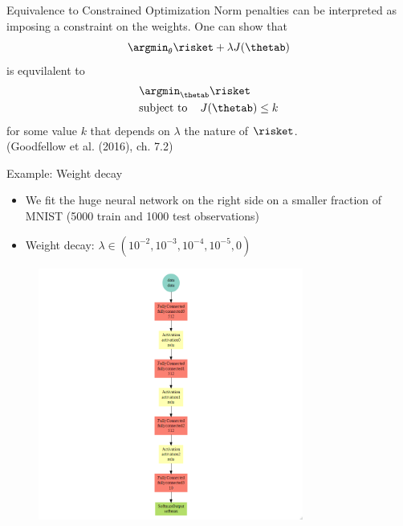 \begin{frame}{Equivalence to Constrained Optimization}
Norm penalties can be interpreted as imposing a constraint on the weights. One can show that 
 $$\argmin_{\theta} \risket + \lambda \text{\(J(\thetab)\)}$$
 is equvilalent to
 \begin{align*}
 & \argmin_{\thetab}  \risket \\
  &\text{subject to \;\;\;}  J(\thetab) \leq k
 \end{align*}
 for some value $k$ that depends on $\lambda$ the nature of 
 $\risket$.\\[0.3cm]
 \scriptsize{(Goodfellow et al. (2016), ch. 7.2)}
\end{frame}

\begin{vbframe}{Example: Weight decay}
\begin{minipage}{0.45\textwidth}
\begin{itemize}
\item We fit the huge neural network on the right side on a smaller fraction of MNIST (5000 train and 1000 test observations)
\item Weight decay: $\lambda \in (10^{-2}, 10^{-3}, 10^{-4}, 10^{-5}, 0)$
\end{itemize}
\end{minipage}
\begin{minipage}{0.45\textwidth}
\begin{figure}
\centering
\includegraphics[width=8.7cm]{figure/mxnet_graph_decay.png}
\end{figure}
\end{minipage}
\framebreak


\end{vbframe}
